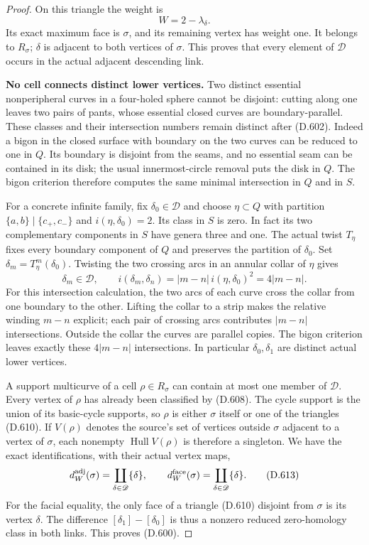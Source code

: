 \begin{proof}
On this triangle the weight is
\[
              W=2-\lambda_\delta.
 \tag{D.611}
\]
Its exact maximum face is $\sigma$, and its remaining
vertex has weight one.  It belongs to $R_\sigma$;
$\delta$ is adjacent to both vertices of $\sigma$.
This proves that every element of $\mathscr D$ occurs
in the actual adjacent descending link.

\medskip\noindent\textbf{No cell connects distinct lower vertices.}
Two distinct essential nonperipheral curves in a
four-holed sphere cannot be disjoint: cutting along
one leaves two pairs of pants, whose essential closed
curves are boundary-parallel.  These classes and their
intersection numbers remain distinct after (D.602).
Indeed a bigon in the closed surface with boundary
on the two curves can be reduced to one in $Q$.
Its boundary is disjoint from the seams, and no
essential seam can be contained in its disk; the
usual innermost-circle removal puts the disk in $Q$.
The bigon criterion therefore computes the same
minimal intersection in $Q$ and in $S$.

For a concrete infinite family, fix
$\delta_0\in\mathscr D$ and choose $\eta\subset Q$
with partition $\{a,b\}\mid\{c_+,c_-\}$ and
$i(\eta,\delta_0)=2$.  Its class in $S$ is zero.
In fact its two complementary components in $S$
have genera three and one.  The actual twist
$T_\eta$ fixes every boundary component of $Q$ and
preserves the partition of $\delta_0$.
Set $\delta_m=T_\eta^m(\delta_0)$.  Twisting the
two crossing arcs in an annular collar of $\eta$
gives
\[
  \delta_m\in\mathscr D,\qquad
  i(\delta_m,\delta_n)
       =|m-n|\,i(\eta,\delta_0)^2=4|m-n|.
 \tag{D.612}
\]
For this intersection calculation, the two arcs of
each curve cross the collar from one boundary to
the other.  Lifting the collar to a strip makes
the relative winding $m-n$ explicit; each pair
of crossing arcs contributes $|m-n|$ intersections.
Outside the collar the curves are parallel copies.
The bigon criterion leaves exactly these
$4|m-n|$ intersections.  In particular
$\delta_0,\delta_1$ are distinct actual lower vertices.

A support multicurve of a cell $\rho\in R_\sigma$
can contain at most one member of $\mathscr D$.
Every vertex of $\rho$ has already been classified
by (D.608).  The cycle support is the union of its
basic-cycle supports, so $\rho$ is either $\sigma$
itself or one of the triangles (D.610).
If $V(\rho)$ denotes the source's set of vertices
outside $\sigma$ adjacent to a vertex of $\sigma$,
each nonempty $\operatorname{Hull}V(\rho)$ is
therefore a singleton.  We have the exact
identifications, with their actual vertex maps,
\[
 d_W^{\rm adj}(\sigma)
       =\coprod_{\delta\in\mathscr D}\{\delta\},
 \qquad
 d_W^{\rm face}(\sigma)
       =\coprod_{\delta\in\mathscr D}\{\delta\}.
 \tag{D.613}
\]
For the facial equality, the only face of a triangle
(D.610) disjoint from $\sigma$ is its vertex $\delta$.
The difference $[\delta_1]-[\delta_0]$ is thus a
nonzero reduced zero-homology class in both links.
This proves (D.600).


\end{proof}
